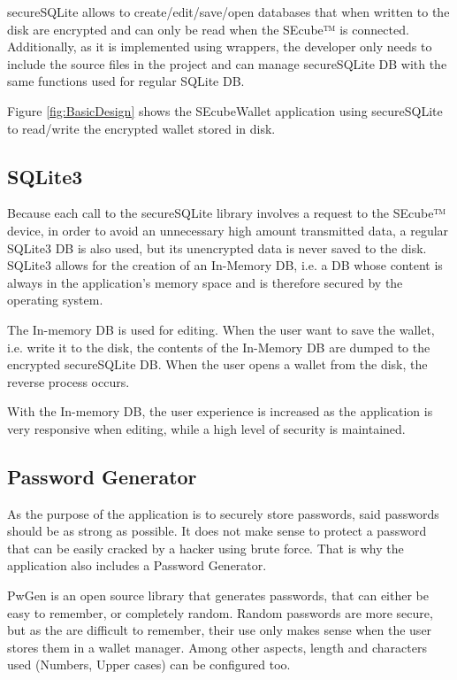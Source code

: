 secureSQLite allows to create/edit/save/open databases that when written to the disk are encrypted and can only be read when the SEcube™ is connected. Additionally, as it is implemented using wrappers, the developer only needs to include the source files in the project and can manage secureSQLite DB with the same functions used for regular SQLite DB.

Figure \ref{fig:BasicDesign} shows the SEcubeWallet application using secureSQLite to read/write the encrypted wallet stored in disk.

\subsection{SQLite3}
Because each call to the secureSQLite library involves a request to the SEcube™ device, in order to avoid an unnecessary high amount transmitted data, a regular SQLite3 DB is also used, but its unencrypted data is never saved to the disk. SQLite3 allows for the creation of an In-Memory DB, i.e. a DB whose content is always in the application's memory space and is therefore secured by the operating system. 

The In-memory DB is used for editing. When the user want to save the wallet, i.e. write it to the disk, the contents of the In-Memory DB are dumped to the encrypted secureSQLite DB. When the user opens a wallet from the disk, the reverse process occurs.

With the In-memory DB, the user experience is increased as the application is very responsive when editing, while a high level of security is maintained.

\subsection{Password Generator}
As the purpose of the application is to securely store passwords, said passwords should be as strong as possible. It does not make sense to protect a password that can be easily cracked by a hacker using brute force. That is why the application also includes a Password Generator.

PwGen \cite{pwgen} is an open source library that generates passwords, that can either be easy to remember, or completely random. Random passwords are more secure, but as the are difficult to remember, their use only makes sense when the user stores them in a wallet manager. Among other aspects, length and characters used (Numbers, Upper cases) can be configured too.

